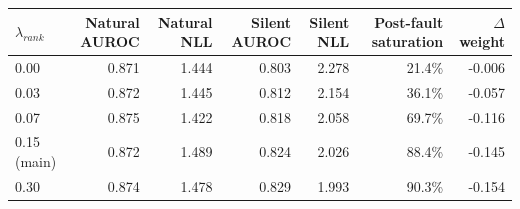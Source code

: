 \begin{tabular}{lrrrrrr}
\toprule
$\lambda_{rank}$ & Natural AUROC & Natural NLL & Silent AUROC & Silent NLL & Post-fault saturation & $\Delta$ weight \\
\midrule
0.00 & 0.871 & 1.444 & 0.803 & 2.278 & 21.4\% & -0.006 \\
0.03 & 0.872 & 1.445 & 0.812 & 2.154 & 36.1\% & -0.057 \\
0.07 & 0.875 & 1.422 & 0.818 & 2.058 & 69.7\% & -0.116 \\
0.15 (main) & 0.872 & 1.489 & 0.824 & 2.026 & 88.4\% & -0.145 \\
0.30 & 0.874 & 1.478 & 0.829 & 1.993 & 90.3\% & -0.154 \\
\bottomrule
\end{tabular}